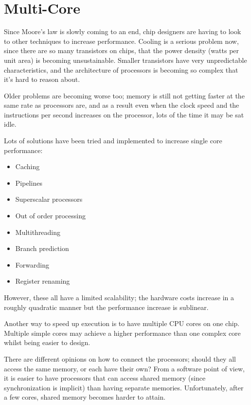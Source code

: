 \section{Multi-Core}

Since Moore's law is slowly coming to an end, chip designers are having to look
to other techniques to increase performance. Cooling is a serious problem now,
since there are so many transistors on chips, that the power density (watts per
unit area) is becoming unsustainable. Smaller transistors have very
unpredictable characteristics, and the architecture of processors is becoming so
complex that it's hard to reason about.

Older problems are becoming worse too; memory is still not getting faster at the
same rate as processors are, and as a result even when the clock speed and the
instructions per second increases on the processor, lots of the time it may be
sat idle.

Lots of solutions have been tried and implemented to increase single core
performance:

\begin{mymulticols}
  \begin{itemize}
    \item Caching
    \item Pipelines
    \item Superscalar processors
    \item Out of order processing
    \item Multithreading
    \item Branch prediction
    \item Forwarding
    \item Register renaming
  \end{itemize}
\end{mymulticols}

However, these all have a limited scalability; the hardware costs increase in a
roughly quadratic manner but the performance increase is sublinear.

Another way to speed up execution is to have multiple CPU cores on one chip.
Multiple simple cores may achieve a higher performance than one complex core
whilst being easier to design.

There are different opinions on how to connect the processors; should they all
access the same memory, or each have their own? From a software point of view,
it is easier to have processors that can access shared memory (since
synchronization is implicit) than having separate memories. Unfortunately,
after a few cores, shared memory becomes harder to attain.

